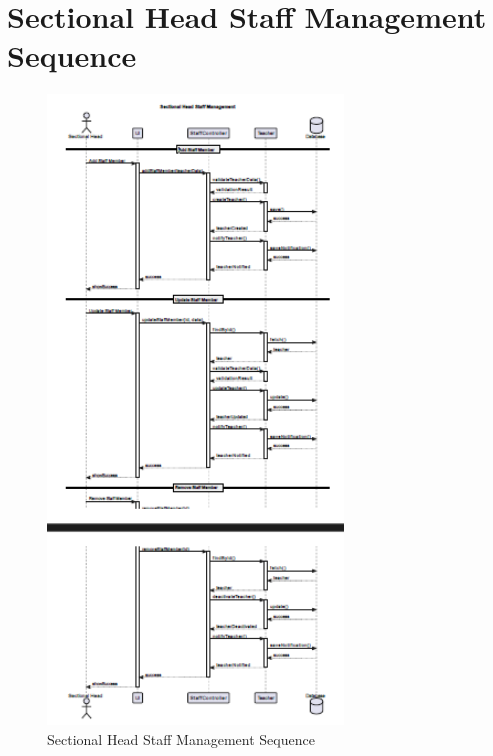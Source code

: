 \documentclass[12pt,a4paper]{report}
\begin{document}
\section{Sectional Head Staff Management Sequence}
\begin{figure}[htbp]
    \centering
    \includegraphics[width=0.7\textwidth]{sectional-head-staff-management-sequence.png}
    \caption{Sectional Head Staff Management Sequence}
    \label{fig:sectional-head-staff-management-sequence}
\end{figure}

\newpage
\end{document}
